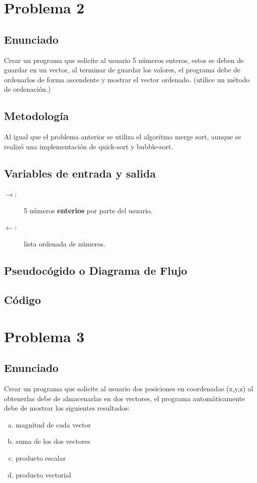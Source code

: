 \section{Problema 2}
\subsection{Enunciado}
Crear un programa que solicite al usuario 5 números enteros, estos se deben de guardar en un vector,
al terminar de guardar los valores, el programa debe de ordenarlos de forma ascendente y mostrar el
vector ordenado. (utilice un método de ordenación.)

\subsection{Metodología}
Al igual que el problema anterior se utiliza el algoritmo merge sort, aunque se realizó una implementación de quick-sort y bubble-sort.

\subsection{Variables de entrada y salida}
\begin{description}
	\item[$\rightarrow$: ] 5 números \textbf{enterios} por parte del usuario.
	\item[$\leftarrow$: ] lista ordenada de números. 
\end{description}

\subsection{Pseudocógido o Diagrama de Flujo}
\subsection{Código}

\section{Problema 3}
\subsection{Enunciado}
Crear un programa que solicite al usuario dos posiciones en coordenadas (x,y,z) al obtenerlas debe de
almacenarlas en dos vectores, el programa automáticamente debe de mostrar los siguientes resultados:
\begin{multicols}{2}
	\begin{enumerate}[a)]
		\item magnitud de cada vector
		\item suma de los dos vectores
		\item producto escalar
		\item producto vectorial
	\end{enumerate}
\end{multicols}

